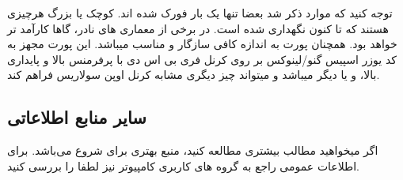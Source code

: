توجه کنید که موارد ذکر شد بعضا تنها یک بار فورک شده اند. کوچک یا بزرگ هرچیزی هستند که تا کنون نگهداری شده است. در برخی از معماری های نادر،
گاها کارآمد تر خواهد بود. همچنان پورت
به اندازه کافی سازگار و مناسب میباشد. این پورت مجهز به کد یوزر اسپیس گنو/لینوکس بر روی کرنل فری بی اس دی با پرفرمنس بالا و پایداری بالا،
و یا دیگر 
میباشد و میتواند چیز دیگری مشابه کرنل اوپن سولاریس فراهم کند.



\subsection{سایر منابع اطلاعاتی}

اگر میخواهید مطالب بیشتری مطالعه کنید، 
منبع بهتری برای شروع می‌باشد. برای اطلاعات عمومی راجع به گروه های کاربری کامپیوتر نیز لطفا
را بررسی کنید.


